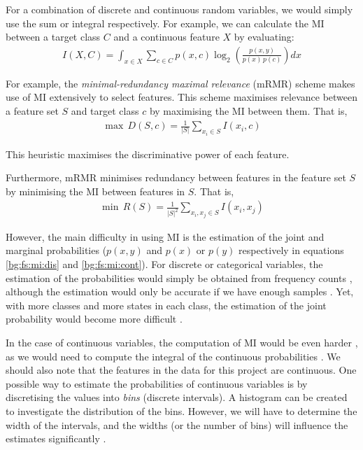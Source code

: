 \documentclass[12pt, twoside, a4paper]{report}
\begin{document}
For a combination of discrete and continuous random variables, we would simply use the sum or integral respectively. For example, we can calculate the MI between a target class $C$ and a continuous feature $X$ by evaluating:
\begin{align} \label{bg:fs:mi:contDis}
I(X, C) = \int_{x \in X} \sum_{c \in C} p(x, c) \log_2 \left( \frac{p(x, y)}{p(x) \, p(c)} \right) dx
\end{align}

For example, the \textit{minimal-redundancy maximal relevance} (mRMR) scheme \cite{RefWorks:182} makes use of MI extensively to select features. This scheme maximises relevance between a feature set $S$ and target class $c$ by maximising the MI between them. That is,
\begin{align*}
\max \, D(S, c) = \frac{1}{|S|} \sum_{x_i \in S} I(x_i, c)
\end{align*}

This heuristic maximises the discriminative power of each feature.

Furthermore, mRMR minimises redundancy between features in the feature set $S$ by minimising the MI between features in $S$. That is,
\begin{align*}
\min \, R(S) = \frac{1}{|S|^2} \sum_{x_i, x_j \in S} I(x_i, x_j)
\end{align*}

However, the main difficulty in using MI is the estimation of the joint and marginal probabilities ($p(x, y)$ and $p(x)$ or $p(y)$ respectively in equations \ref{bg:fs:mi:dis} and \ref{bg:fs:mi:cont}). For discrete or categorical variables, the estimation of the probabilities would simply be obtained from frequency counts \cite{RefWorks:183}, although the estimation would only be accurate if we have enough samples \cite{RefWorks:182}. Yet, with more classes and more states in each class, the estimation of the joint probability would become more difficult \cite{RefWorks:140}.

In the case of continuous variables, the computation of MI would be even harder \cite{RefWorks:185}, as we would need to compute the integral of the continuous probabilities \cite{RefWorks:192}. We should also note that the features in the data for this project are continuous. One possible way to estimate the probabilities of continuous variables is by discretising the values into \textit{bins} (discrete intervals). A histogram can be created to investigate the distribution of the bins. However, we will have to determine the width of the intervals, and the widths (or the number of bins) will influence the estimates significantly \cite{RefWorks:186}.
\end{document}
